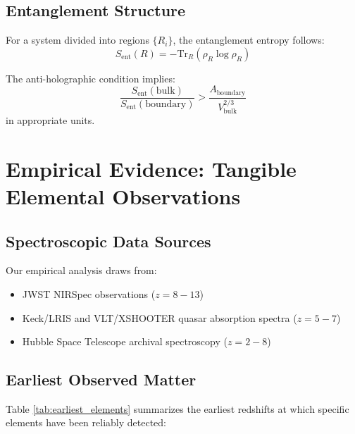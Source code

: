 \documentclass[twocolumn,aps,prd,superscriptaddress,nofootinbib]{revtex4-2}
\begin{document}
\subsection{Entanglement Structure}

For a system divided into regions $\{R_i\}$, the entanglement entropy follows:
\begin{equation}
S_{\text{ent}}(R) = -\text{Tr}_R(\rho_R \log \rho_R)
\end{equation}

The anti-holographic condition implies:
\begin{equation}
\frac{S_{\text{ent}}(\text{bulk})}{S_{\text{ent}}(\text{boundary})} > \frac{A_{\text{boundary}}}{V_{\text{bulk}}^{2/3}}
\label{eq:entanglement_criterion}
\end{equation}
in appropriate units.

\section{Empirical Evidence: Tangible Elemental Observations}

\subsection{Spectroscopic Data Sources}

Our empirical analysis draws from:
\begin{itemize}
    \item JWST NIRSpec observations ($z = 8-13$) \cite{Robertson2023, Curtis-Lake2023}
    \item Keck/LRIS and VLT/XSHOOTER quasar absorption spectra ($z = 5-7$)
    \item Hubble Space Telescope archival spectroscopy ($z = 2-8$)
\end{itemize}

\subsection{Earliest Observed Matter}

Table \ref{tab:earliest_elements} summarizes the earliest redshifts at which specific elements have been reliably detected:
\end{document}
